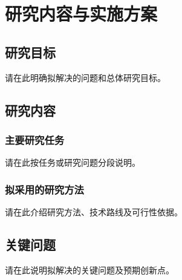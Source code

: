 \chapter{研究内容与实施方案}
\section{研究目标}
请在此明确拟解决的问题和总体研究目标。
\section{研究内容}
\subsection{主要研究任务}
请在此按任务或研究问题分段说明。
\subsection{拟采用的研究方法}
请在此介绍研究方法、技术路线及可行性依据。
\section{关键问题}
请在此说明拟解决的关键问题及预期创新点。
